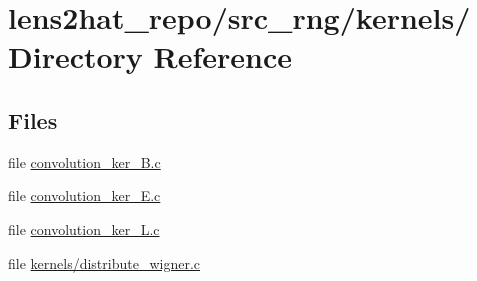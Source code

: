 \section{lens2hat\-\_\-repo/src\-\_\-rng/kernels/ Directory Reference}
\label{dir_d206cab9e8e7697e0a5db818fc489fba}
\subsection*{Files}
\begin{DoxyCompactItemize}
\item 
file \hyperlink{convolution__ker__B_8c}{convolution\-\_\-ker\-\_\-\-B.\-c}
\item 
file \hyperlink{convolution__ker__E_8c}{convolution\-\_\-ker\-\_\-\-E.\-c}
\item 
file \hyperlink{convolution__ker__L_8c}{convolution\-\_\-ker\-\_\-\-L.\-c}
\item 
file \hyperlink{kernels_2distribute__wigner_8c}{kernels/distribute\-\_\-wigner.\-c}
\end{DoxyCompactItemize}
